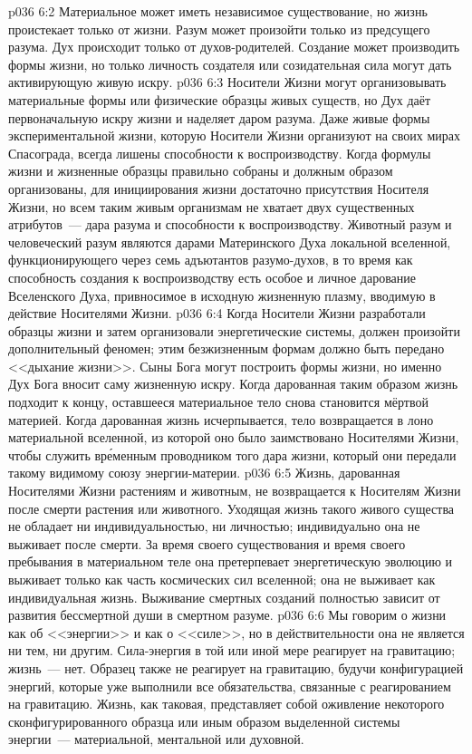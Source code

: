 \vs p036 6:2 Материальное может иметь независимое существование, но жизнь проистекает только от жизни. Разум может произойти только из предсущего разума. Дух происходит только от духов\hyp{}родителей. Создание может производить формы жизни, но только личность создателя или созидательная сила могут дать активирующую живую искру.
\vs p036 6:3 Носители Жизни могут организовывать материальные формы или физические образцы живых существ, но Дух даёт первоначальную искру жизни и наделяет даром разума. Даже живые формы экспериментальной жизни, которую Носители Жизни организуют на своих мирах Спасограда, всегда лишены способности к воспроизводству. Когда формулы жизни и жизненные образцы правильно собраны и должным образом организованы, для инициирования жизни достаточно присутствия Носителя Жизни, но всем таким живым организмам не хватает двух существенных атрибутов~--- дара разума и способности к воспроизводству. Животный разум и человеческий разум являются дарами Материнского Духа локальной вселенной, функционирующего через семь адъютантов разумо\hyp{}духов, в то время как способность создания к воспроизводству есть особое и личное дарование Вселенского Духа, привносимое в исходную жизненную плазму, вводимую в действие Носителями Жизни.
\vs p036 6:4 \pc Когда Носители Жизни разработали образцы жизни и затем организовали энергетические системы, должен произойти дополнительный феномен; этим безжизненным формам должно быть передано <<дыхание жизни>>. Сыны Бога могут построить формы жизни, но именно Дух Бога вносит саму жизненную искру. Когда дарованная таким образом жизнь подходит к концу, оставшееся материальное тело снова становится мёртвой материей. Когда дарованная жизнь исчерпывается, тело возвращается в лоно материальной вселенной, из которой оно было заимствовано Носителями Жизни, чтобы служить вр\'еменным проводником того дара жизни, который они передали такому видимому союзу энергии\hyp{}материи.
\vs p036 6:5 Жизнь, дарованная Носителями Жизни растениям и животным, не возвращается к Носителям Жизни после смерти растения или животного. Уходящая жизнь такого живого существа не обладает ни индивидуальностью, ни личностью; индивидуально она не выживает после смерти. За время своего существования и время своего пребывания в материальном теле она претерпевает энергетическую эволюцию и выживает только как часть космических сил вселенной; она не выживает как индивидуальная жизнь. Выживание смертных созданий полностью зависит от развития бессмертной души в смертном разуме.
\vs p036 6:6 \pc Мы говорим о жизни как об <<энергии>> и как о <<силе>>, но в действительности она не является ни тем, ни другим. Сила\hyp{}энергия в той или иной мере реагирует на гравитацию; жизнь~--- нет. Образец также не реагирует на гравитацию, будучи конфигурацией энергий, которые уже выполнили все обязательства, связанные с реагированием на гравитацию. Жизнь, как таковая, представляет собой оживление некоторого сконфигурированного образца или иным образом выделенной системы энергии~--- материальной, ментальной или духовной.
